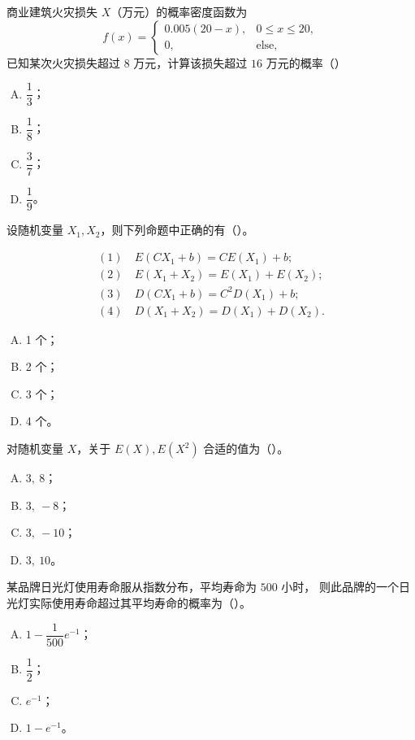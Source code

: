 \begin{homework}[4]
商业建筑火灾损失 $X$（万元）的概率密度函数为
\[
f(x)=
\begin{cases}
0.005(20-x), & 0\le x\le20,\\[3pt]
0, & \text{else},
\end{cases}
\]
已知某次火灾损失超过 $8$ 万元，计算该损失超过 $16$ 万元的概率（\hfill）

\begin{enumerate}[(A)]
  \item $\dfrac13$；
  \item $\dfrac18$；
  \item $\dfrac37$；
  \item $\dfrac19$。
\end{enumerate}
\end{homework}
\begin{homework}[5]
设随机变量 $X_1,X_2$，则下列命题中正确的有（\hfill）。

\[
\begin{aligned}
(1)\ &E(CX_1+b)=CE(X_1)+b;\\
(2)\ &E(X_1+X_2)=E(X_1)+E(X_2);\\
(3)\ &D(CX_1+b)=C^2D(X_1)+b;\\
(4)\ &D(X_1+X_2)=D(X_1)+D(X_2).
\end{aligned}
\]

\begin{enumerate}[(A)]
  \item 1 个；
  \item 2 个；
  \item 3 个；
  \item 4 个。
\end{enumerate}
\end{homework}

\begin{homework}[6]
对随机变量 $X$，关于 $E(X),E(X^2)$ 合适的值为（\hfill）。

\begin{enumerate}[(A)]
  \item $3,\ 8$；
  \item $3,\ -8$；
  \item $3,\ -10$；
  \item $3,\ 10$。
\end{enumerate}
\end{homework}

\begin{homework}[7]
某品牌日光灯使用寿命服从指数分布，平均寿命为 $500$ 小时，
则此品牌的一个日光灯实际使用寿命超过其平均寿命的概率为（\hfill）。

\begin{enumerate}[(A)]
  \item $1-\dfrac1{500}e^{-1}$；
  \item $\dfrac12$；
  \item $e^{-1}$；
  \item $1-e^{-1}$。
\end{enumerate}
\end{homework}

